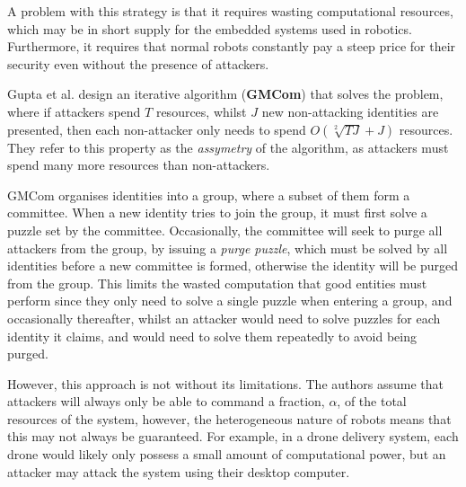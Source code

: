 A problem with this strategy is that it requires wasting computational resources, which may be in short supply for the embedded systems used in robotics. Furthermore, it requires that normal robots constantly pay a steep price for their security even without the presence of attackers.

Gupta et al. \cite{PoW} design an iterative algorithm (\textbf{GMCom}) that solves the  problem, where if attackers spend $T$ resources, whilst $J$ new non-attacking identities are presented, then each non-attacker only needs to spend $O(\sqrt[2]{TJ} + J)$ resources. They refer to this property as the \textit{assymetry} of the algorithm, as attackers must spend many more resources than non-attackers.

GMCom organises identities into a group, where a subset of them form a committee. When a new identity tries to join the group, it must first solve a puzzle set by the committee. Occasionally, the committee will seek to purge all attackers from the group, by issuing a \textit{purge puzzle}, which must be solved by all identities before a new committee is formed, otherwise the identity will be purged from the group. This limits the wasted computation that good entities must perform since they only need to solve a single puzzle when entering a group, and occasionally thereafter, whilst an attacker would need to solve puzzles for each identity it claims, and would need to solve them repeatedly to avoid being purged.

However, this approach is not without its limitations. The authors assume that attackers will always only be able to command a fraction, $\alpha$, of the total resources of the system, however, the heterogeneous nature of robots means that this may not always be guaranteed. For example, in a drone delivery system, each drone would likely only possess a small amount of computational power, but an attacker may attack the system using their desktop computer.

